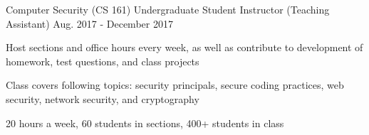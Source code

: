 \vspace{-5mm}
\vspace{-3mm}


\begin{cventries}

  \cventry
    {Computer Security (CS 161)} %
    {Undergraduate Student Instructor (Teaching Assistant)} %
    {Aug. 2017 - December 2017} %
    {} %
    {
      \begin{cvitems} %
        \item {Host sections and office hours every week, as well as contribute to development of homework, test questions, and class projects}
        \item {Class covers following topics: security principals, secure coding practices, web security, network security, and cryptography}
        \item {20 hours a week, 60 students in sections, 400+ students in class}
      \end{cvitems}
    }
 

\end{cventries}
